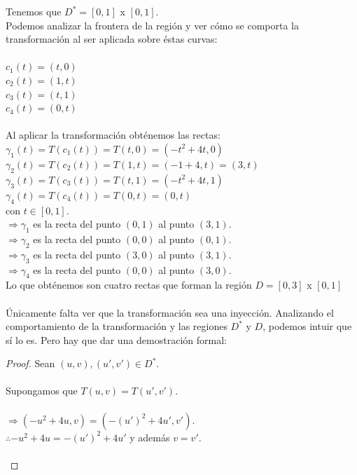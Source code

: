 \documentclass[10pt,letterpaper,fleqn]{article}
\begin{document}
\begin{enumerate}
        Tenemos que $D^* = [0,1]$ x $[0,1]$.\\
        Podemos analizar la frontera de la región y ver cómo se comporta la transformación al ser aplicada sobre éstas curvas:\\\\
        $c_1(t) = (t, 0)$\\
        $c_2(t) = (1, t)$\\
        $c_3(t) = (t, 1)$\\
        $c_4(t) = (0, t)$\\\\
        Al aplicar la transformación obténemos las rectas:\\
        $\gamma_1(t) = T(c_1(t)) = T(t, 0) = (-t^2 + 4t, 0)$\\
        $\gamma_2(t) = T(c_2(t)) = T(1, t) = (-1 + 4, t) = (3, t)$\\
		$\gamma_3(t) = T(c_3(t)) = T(t, 1) = (-t^2 + 4t, 1)$\\        
        $\gamma_4(t) = T(c_4(t)) = T(0, t) = (0, t)$\\
        con $t \in [0,1]$.\\
        $\Rightarrow \gamma_1$ es la recta del punto $(0,1)$ al punto $(3,1)$.\\
        $\Rightarrow \gamma_2$ es la recta del punto $(0,0)$ al punto $(0,1)$.\\
        $\Rightarrow \gamma_3$ es la recta del punto $(3,0)$ al punto $(3,1)$.\\
        $\Rightarrow \gamma_4$ es la recta del punto $(0,0)$ al punto $(3,0)$.\\
        Lo que obténemos son cuatro rectas que forman la región $D = [0, 3]$ x $[0, 1]$\\\\       
        Únicamente falta ver que la transformación sea una inyección. Analizando el comportamiento de la transformación y las regiones $D^*$ y $D$, podemos intuir que sí lo es. Pero hay que dar una demostración formal:
        \begin{proof}
        \vspace{0.2cm}
        Sean $(u,v), (u', v') \in D^*$.\\\\
        Supongamos que $T(u, v) = T(u', v')$.\\\\
        $\Rightarrow (-u^2 + 4u, v) = (-(u')^2 + 4u', v')$.\\
        $\therefore -u^2 + 4u = -(u')^2 + 4u'$ y además $v = v'$.\\\\

\end{proof}
\end{enumerate}
\end{document}
